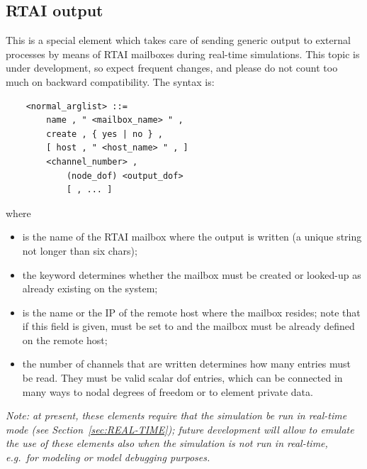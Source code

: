 \subsection{RTAI output}\label{sec:RTAI_out}
This is a special element which takes care of sending generic output
to external processes by means of RTAI mailboxes during real-time 
simulations.
This topic is under development, so expect frequent changes, and
please do not count too much on backward compatibility.
The syntax is:
\begin{verbatim}
    <normal_arglist> ::=
        name , " <mailbox_name> " ,
        create , { yes | no } ,
        [ host , " <host_name> " , ]
        <channel_number> ,
            (node_dof) <output_dof>
            [ , ... ]
\end{verbatim}
where
\begin{itemize}
\item {} is the name of the RTAI mailbox where 
the output is written  (a unique string not longer than six chars);
\item the  keyword determines whether the mailbox
must be created or looked-up as already existing on the system;
\item {} is the name or the IP of the remote host where
the mailbox resides; note that if this field is given,  must
be set to  and the mailbox must be already defined
on the remote host;
\item the number of channels  that are written
determines how many  entries must be read.
They must be valid scalar dof entries, which can be connected
in many ways to nodal degrees of freedom or to element private data.
\end{itemize}

\emph{Note: at present, these elements require that the simulation
be run in real-time mode (see Section~\ref{sec:REAL-TIME});
future development will allow to emulate the use of these elements
also when the simulation is not run in real-time, e.g.\ for modeling
or model debugging purposes.}






